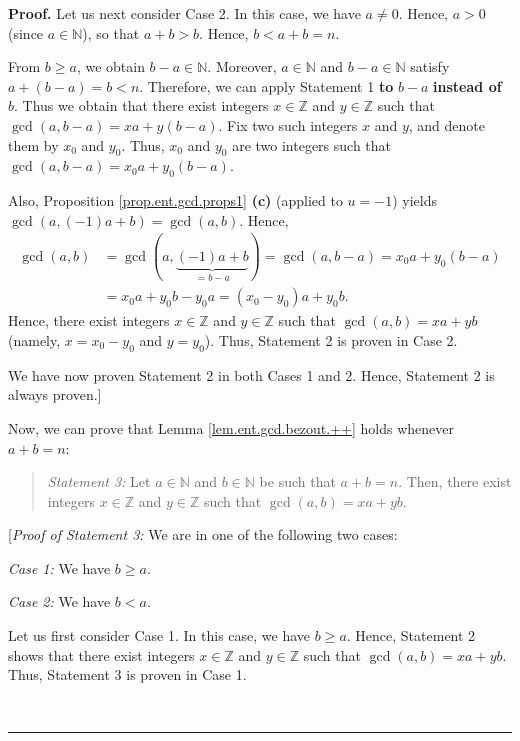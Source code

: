 \documentclass[numbers=enddot,12pt,final,onecolumn,notitlepage]{scrartcl}%
\numberwithin{exer}{subsection}
\theoremstyle{definition}
\newenvironment{statement}{\begin{quote}}{\end{quote}}
\newenvironment{proof}[1][Proof]{\noindent\textbf{#1.} }{\ \rule{0.5em}{0.5em}}
\begin{document}
\begin{proof}
Let us next consider Case 2. In this case, we have $a\neq0$. Hence, $a>0$
(since $a\in\mathbb{N}$), so that $a+b>b$. Hence, $b<a+b=n$.

From $b\geq a$, we obtain $b-a\in\mathbb{N}$. Moreover, $a\in\mathbb{N}$ and
$b-a\in\mathbb{N}$ satisfy $a+\left(  b-a\right)  =b<n$. Therefore, we can
apply Statement 1 \textbf{to }$b-a$ \textbf{instead of }$b$. Thus we obtain
that there exist integers $x\in\mathbb{Z}$ and $y\in\mathbb{Z}$ such that
$\gcd\left(  a,b-a\right)  =xa+y\left(  b-a\right)  $. Fix two such integers
$x$ and $y$, and denote them by $x_{0}$ and $y_{0}$. Thus, $x_{0}$ and $y_{0}$
are two integers such that $\gcd\left(  a,b-a\right)  =x_{0}a+y_{0}\left(
b-a\right)  $.

Also, Proposition \ref{prop.ent.gcd.props1} \textbf{(c)} (applied to $u=-1$)
yields $\gcd\left(  a,\left(  -1\right)  a+b\right)  =\gcd\left(  a,b\right)
$. Hence,%
\begin{align*}
\gcd\left(  a,b\right)   &  =\gcd\left(  a,\underbrace{\left(  -1\right)
a+b}_{=b-a}\right)  =\gcd\left(  a,b-a\right)  =x_{0}a+y_{0}\left(  b-a\right)
\\
&  =x_{0}a+y_{0}b-y_{0}a=\left(  x_{0}-y_{0}\right)  a+y_{0}b.
\end{align*}
Hence, there exist integers $x\in\mathbb{Z}$ and $y\in\mathbb{Z}$ such that
$\gcd\left(  a,b\right)  =xa+yb$ (namely, $x=x_{0}-y_{0}$ and $y=y_{0}$).
Thus, Statement 2 is proven in Case 2.

We have now proven Statement 2 in both Cases 1 and 2. Hence, Statement 2 is
always proven.]

Now, we can prove that Lemma \ref{lem.ent.gcd.bezout.++} holds whenever
$a+b=n$:

\begin{statement}
\textit{Statement 3:} Let $a\in\mathbb{N}$ and $b\in\mathbb{N}$ be such that
$a+b=n$. Then, there exist integers $x\in\mathbb{Z}$ and $y\in\mathbb{Z}$ such
that $\gcd\left(  a,b\right)  =xa+yb$.
\end{statement}

[\textit{Proof of Statement 3:} We are in one of the following two cases:

\textit{Case 1:} We have $b\geq a$.

\textit{Case 2:} We have $b<a$.

Let us first consider Case 1. In this case, we have $b\geq a$. Hence,
Statement 2 shows that there exist integers $x\in\mathbb{Z}$ and
$y\in\mathbb{Z}$ such that $\gcd\left(  a,b\right)  =xa+yb$. Thus, Statement 3
is proven in Case 1.


\end{proof}
\end{document}
